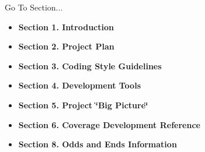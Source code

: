 \begin{Desc}
\item[Go To Section...]\begin{itemize}
\item {\bf Section 1.  Introduction} \item {\bf Section 2.  Project Plan} \item {\bf Section 3.  Coding Style Guidelines} \item {\bf Section 4.  Development Tools} \item {\bf Section 5.  Project \char`\"{}Big Picture\char`\"{}} \item {\bf Section 6.  Coverage Development Reference} \item {\bf Section 8.  Odds and Ends Information} \end{itemize}
\end{Desc}
